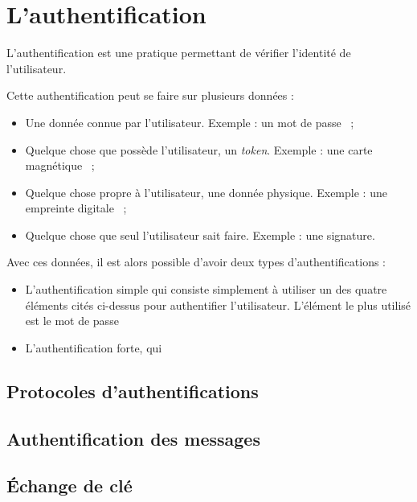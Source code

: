 \section{L'authentification}
L'authentification est une pratique permettant de vérifier
l'identité de l'utilisateur.

Cette authentification peut se faire sur plusieurs données : 
\begin{itemize}
  \item Une donnée connue par l'utilisateur. Exemple : un mot de
passe ~;
  \item Quelque chose que possède l'utilisateur, un \emph{token}.
Exemple : une carte magnétique ~;
  \item Quelque chose propre à l'utilisateur, une donnée physique.
Exemple : une empreinte digitale ~;
  \item Quelque chose que seul l'utilisateur sait faire. Exemple :
une signature.
\end{itemize}

Avec ces données, il est alors possible d'avoir deux types
d'authentifications : 
\begin{itemize}
  \item L'authentification simple qui consiste simplement à
utiliser un des quatre éléments cités ci-dessus pour authentifier
l'utilisateur. L'élément le plus utilisé est le mot de passe
  \item L'authentification forte, qui 

\end{itemize}

\subsection{Protocoles d'authentifications}

\subsection{Authentification des messages}

\subsection{Échange de clé}
